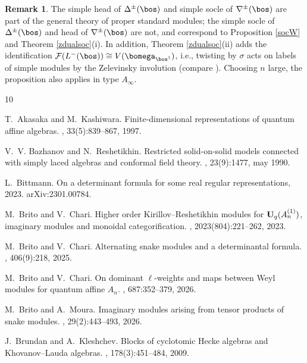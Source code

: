 \documentclass[11pt,reqno]{amsart}
\theoremstyle{definition} \newtheorem*{defn}{Definition}
\theoremstyle{definition}
\newtheorem*{rem}{Remark}
\numberwithin{equation}{section}
\begin{document}
\begin{rem}  The simple head of $\Delta^\pm(\bos)$ and simple socle of $\nabla^\pm(\bos)$ are part of the general theory of proper standard modules; the simple socle of $\Delta^\pm(\bos)$ and head of $\nabla^\pm(\bos)$ are not, and correspond to Proposition \ref{socW} and Theorem \ref{zdualsoc}(i). In addition, Theorem \ref{zdualsoc}(ii) adds  the identification $\mathcal F(L^-(\bos))\cong V(\bomega_{\bos^\dagger})$, i.e., twisting by $\sigma$ acts on labels of simple modules by the Zelevinsky involution (compare \cite{JL10,LTV99}). Choosing $n$ large, the proposition also applies in type $A_\infty$.

\end{rem}
\begin{thebibliography}{10}

T.~Akasaka and M.~Kashiwara.
\newblock Finite-dimensional representations of quantum affine algebras.
, 33(5):839--867, 1997.

V.~V. Bazhanov and N.~Reshetikhin.
\newblock Restricted solid-on-solid models connected with simply laced algebras and conformal field theory.
, 23(9):1477, may 1990.

L.~Bittmann.
\newblock On a determinant formula for some real regular representations, 2023.
\newblock arXiv:2301.00784.

M.~Brito and V.~Chari.
\newblock Higher order {K}irillov--{R}eshetikhin modules for {$\bold U_q(A_n^{(1)})$}, imaginary modules and monoidal categorification.
, 2023(804):221--262, 2023.

M.~Brito and V.~Chari.
\newblock Alternating snake modules and a determinantal formula.
, 406(9):218, 2025.

M.~Brito and V.~Chari.
\newblock On dominant $\ell$-weights and maps between {W}eyl modules for quantum affine ${A}_n$.
, 687:352--379, 2026.

M.~Brito and A.~Moura.
\newblock Imaginary modules arising from tensor products of snake modules.
, 29(2):443--493, 2026.

J.~Brundan and A.~Kleshchev.
\newblock Blocks of cyclotomic {H}ecke algebras and {K}hovanov--{L}auda algebras.
, 178(3):451--484, 2009.


\end{thebibliography}
\end{document}
